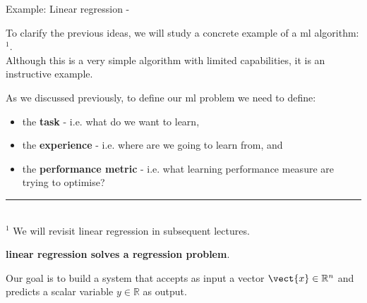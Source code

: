 
%
%
%

\begin{frame}[t,allowframebreaks]{
    Example: Linear regression - }

    To clarify the previous ideas, 
    we will study a concrete example
    of a \gls{ml} algorithm: 
    $^{1}$.\\
    \vspace{0.2cm}
    Although this is a very simple algorithm with limited capabilities,
    it is an instructive example.\\
    \vspace{0.2cm}

    As we discussed previously, 
    to define our \gls{ml} problem we need to define:\\
    \vspace{0.1cm}

    \begin{itemize}
        \item 
        the {\bf task} - 
        i.e. what do we want to learn,\\
        \vspace{0.1cm}
        \item 
        the {\bf experience} - 
        i.e. where are we going to learn from, and\\
        \vspace{0.1cm}
        \item 
        the {\bf performance metric} - 
        i.e. what learning performance measure are trying to optimise?\\
    \end{itemize}

    \vspace{0.2cm}
    \noindent\rule{4cm}{0.4pt}\\
    {\scriptsize
      $^{1}$ We will revisit \gls{linear regression}
      in subsequent lectures.\\
    }

    \framebreak


    {\bf \Gls{linear regression} solves a 
    \gls{regression} problem}.\\
    \vspace{0.2cm}

    Our goal is to build a system that 
    accepts as input a vector $\vect{x} \in \mathbb{R}^n$
    and predicts a scalar variable $y \in \mathbb{R}$ as output.\\
    \vspace{0.2cm}


\end{frame}
